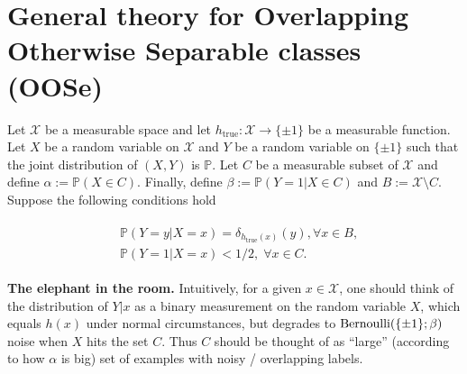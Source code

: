 \section{General theory for Overlapping Otherwise Separable classes (OOSe)}
Let $\mathcal X$ be a measurable space
and let $h_{\text{true}}:\mathcal X \rightarrow \{\pm 1\}$ be a measurable
function. Let $X$ be a random variable on $\mathcal X$ and $Y$ be a random
variable on $\{\pm 1\}$ such that the joint distribution of $(X,Y)$ is $\mathbb
P$. Let $C$ be a measurable subset of $\mathcal X$ and define
$\alpha:=\mathbb{P}(X \in C)$. Finally, define $\beta := \mathbb P(Y=1|X\in C)$
and $B:=\mathcal X\setminus C$. Suppose the following conditions hold

\begin{assumption}
\begin{eqnarray}
  \begin{split}
    &\mathbb P(Y=y|X=x)=\delta_{h_{\text{true}}(x)}(y), \forall x \in B,\\    
    &\mathbb P(Y=1|X=x) < 1/2,\;\forall x \in C.
  \end{split}
\end{eqnarray}
\label{thm:overlap_assumption}
\end{assumption}
\begin{mdframed}
  \textbf{The elephant in the room.}
  Intuitively, for a given $x \in \mathcal X$, one should think of the
distribution of $Y|x$ as a binary measurement on the random variable $X$, which
equals $h(x)$ under normal circumstances, but degrades to $\operatorname{Bernoulli}(\{\pm
1\};\beta)$ noise when $X$ hits the set $C$. Thus $C$ should be thought of as
``large'' (according to how $\alpha$ is big) set of examples with noisy /
overlapping labels.
\end{mdframed}

